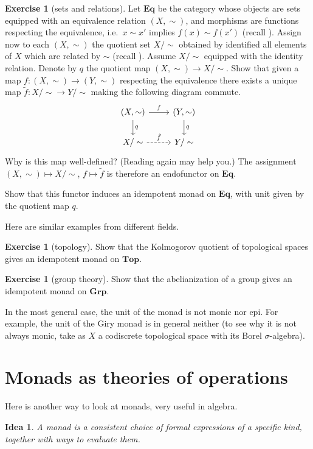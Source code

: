 \documentclass[12pt,oneside]{scrbook}
\numberwithin{equation}{section}
\theoremstyle{plain}
\newtheorem*{idea}{Idea}
\theoremstyle{definition}
\newtheorem{ex}[thm]{Exercise}
\newcommand{\cat}[1]{{\mathbf{#1}}} %
\newcommand{\ar}[2][]{\arrow{#2}{#1}}
\newcommand{\uni}[2][]{\arrow[dashrightarrow]{#2}{#1}} %
\DeclareMathOperator{\1}{\mathbbm{1}}
\DeclareMathOperator{\2}{\mathbbm{2}}
\begin{document}
\begin{ex}[sets and relations]
 Let $\cat{Eq}$ be the category whose objects are sets equipped with an equivalence relation $(X,\sim)$, and morphisms are functions respecting the equivalence, i.e.~$x\sim x'$ implies $f(x)\sim f(x')$ (recall ).   
 Assign now to each $(X,\sim)$ the quotient set $X/\sim$ obtained by identified all elements of $X$ which are related by $\sim$ (recall ). Assume $X/\sim$ equipped with the identity relation. Denote by $q$ the quotient map $(X,\sim)\to X/\sim$.
 Show that given a map $f:(X,\sim)\to(Y,\sim)$ respecting the equivalence there exists a unique map $\tilde{f}:X/\sim\to Y/\sim$ making the following diagram commute.
 $$
 \begin{tikzcd}
  (X,\sim) \ar{d}{q} \ar{r}{f} & (Y,\sim) \ar{d}{q} \\
  X/\sim \uni{r}{\tilde{f}} & Y/\sim
 \end{tikzcd}
 $$
 Why is this map well-defined? (Reading  again may help you.)
 The assignment $(X,\sim)\mapsto X/\sim$, $f\mapsto\tilde{f}$ is therefore an endofunctor on $\cat{Eq}$.
 
 Show that this functor induces an idempotent monad on $\cat{Eq}$, with unit given by the quotient map $q$.
\end{ex}

Here are similar examples from different fields.

\begin{ex}[topology]\label{kolmogorovquotient}
 Show that the Kolmogorov quotient of topological spaces gives an idempotent monad on $\cat{Top}$.
\end{ex}

\begin{ex}[group theory]\label{abelianization}
 Show that the abelianization of a group gives an idempotent monad on $\cat{Grp}$. 
\end{ex}

In the most general case, the unit of the monad is not monic nor epi. For example, the unit of the Giry monad is in general neither (to see why it is not always monic, take as $X$ a codiscrete topological space with its Borel $\sigma$-algebra).


\section{Monads as theories of operations}

Here is another way to look at monads, very useful in algebra.
\begin{idea} 
	A monad is a consistent choice of formal expressions of a specific kind, together with ways to evaluate them. 
\end{idea}
\end{document}
